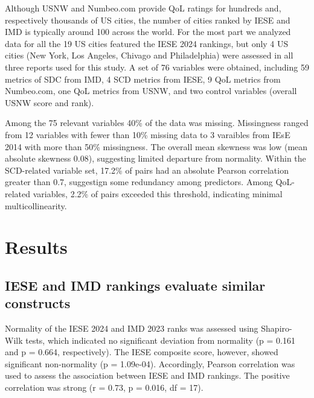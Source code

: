 \documentclass[
  english,
  12pt,
  a4paper,
]{scrartcl}
\begin{document}
Although USNW and Numbeo.com provide QoL ratings for hundreds and,
respectively thousands of US cities, the number of cities ranked by IESE
and IMD is typically around 100 across the world. For the most part we
analyzed data for all the 19 US cities featured the IESE 2024 rankings,
but only 4 US cities (New York, Los Angeles, Chivago and Philadelphia)
were assessed in all three reports used for this study. A set of 76
variables were obtained, including 59 metrics of SDC from IMD, 4 SCD
metrics from IESE, 9 QoL metrics from Numbeo.com, one QoL metrics from
USNW, and two control variables (overall USNW score and rank).

Among the 75 relevant variables 40\% of the data was missing.
Missingness ranged from 12 variables with fewer than 10\% missing data
to 3 varaibles from IEsE 2014 with more than 50\% missingness. The
overall mean skewness was low (mean absolute skewness 0.08), suggesting
limited departure from normality. Within the SCD-related variable set,
17.2\% of pairs had an absolute Pearson correlation greater than 0.7,
suggestign some redundancy among predictors. Among QoL-related
variables, 2.2\% of pairs exceeded this threshold, indicating minimal
multicollinearity.

\section{Results}\label{results}

\subsection{IESE and IMD rankings evaluate similar
constructs}\label{iese-and-imd-rankings-evaluate-similar-constructs}

Normality of the IESE 2024 and IMD 2023 ranks was assessed using
Shapiro-Wilk tests, which indicated no significant deviation from
normality (p = 0.161 and p = 0.664, respectively). The IESE composite
score, however, showed significant non-normality (p = 1.09e-04).
Accordingly, Pearson correlation was used to assess the association
between IESE and IMD rankings. The positive correlation was strong (r =
0.73, p = 0.016, df = 17).
\end{document}
